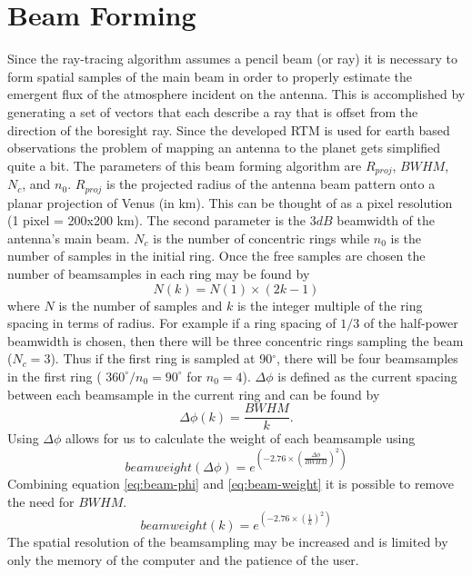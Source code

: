 \section{Beam Forming}

Since the ray-tracing algorithm assumes a pencil beam (or ray) it is necessary to form spatial samples of the main beam in order to properly estimate the emergent flux of the atmosphere incident on the antenna. This is accomplished by generating a set of vectors that each describe a ray that is offset from the direction of the boresight ray. Since the developed RTM is used for earth based observations the problem of mapping an antenna to the planet gets simplified quite a bit. The parameters of this beam forming algorithm are $R_{proj}$, $BWHM$, $N_c$, and $n_0$. $R_{proj}$ is the projected radius of the antenna beam pattern onto a planar projection of Venus (in km). This can be thought of as a pixel resolution (1 pixel = 200x200 km). The second parameter is the $3dB$ beamwidth of the antenna's main beam. $N_c$ is the number of concentric rings while $n_0$ is the number of samples in the initial ring. Once the free samples are chosen the number of beamsamples in each ring may be found by
\begin{equation}
N(k) = N(1) \times (2k-1)
\end{equation}
where $N$ is the number of samples and $k$ is the integer multiple of the ring spacing in terms of radius. For example if a ring spacing of $1/3$ of the half-power beamwidth is chosen, then there will be three concentric rings sampling the beam ($N_c=3$). Thus if the first ring is sampled at 90$^\circ$, there will be four beamsamples in the first ring ( $360^\circ / n_0 = 90^\circ$ for $n_0 = 4$). $\Delta\phi$ is defined as the current spacing between each beamsample in the current ring and can be found by
\begin{equation}\label{eq:beam-phi}
\Delta\phi(k) = \frac{BWHM}{k}.
\end{equation} 
Using $\Delta\phi$ allows for us to calculate the weight of each beamsample using
\begin{equation} \label{eq:beam-weight}
beamweight(\Delta\phi) = e^{\left( -2.76\times \left(\frac{\Delta\phi}{BWHM}\right)^2\right)}
\end{equation}
Combining equation \ref{eq:beam-phi} and \ref{eq:beam-weight} it is possible to remove the need for $BWHM$.
\begin{equation}
beamweight(k) = e^{\left( -2.76\times \left(\frac{1}{k}\right)^2\right)}
\end{equation}
The spatial resolution of the beamsampling may be increased and is limited by only the memory of the computer and the patience of the user. 